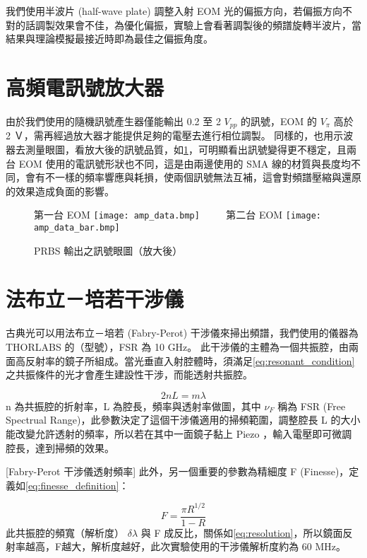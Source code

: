 \documentclass[class=NCU_thesis, crop=false]{standalone}
\begin{document}
我們使用半波片 (half-wave plate) 調整入射 EOM 光的偏振方向，若偏振方向不對的話調製效果會不佳，為優化偏振，實驗上會看著調製後的頻譜旋轉半波片，當結果與理論模擬最接近時即為最佳之偏振角度。

\section{高頻電訊號放大器}
由於我們使用的隨機訊號產生器僅能輸出 0.2 至 2 $V_{pp}$ 的訊號，EOM 的 $V_{\pi}$ 高於 2 Ｖ，需再經過放大器才能提供足夠的電壓去進行相位調製。
同樣的，也用示波器去測量眼圖，看放大後的訊號品質，如\cref{fig:amp_prbs_eye}，可明顯看出訊號變得更不穩定，且兩台 EOM 使用的電訊號形狀也不同，這是由兩邊使用的 SMA 線的材質與長度均不同，會有不一樣的頻率響應與耗損，使兩個訊號無法互補，這會對頻譜壓縮與還原的效果造成負面的影響。

\begin{figure}[!hbt]
    \centering
    \subcaptionbox
        {第一台 EOM
        \label{fig:subfig_fig1}}
        {\texttt{[image: amp\_data.bmp]}}
    ~~~~
    \subcaptionbox
        {第二台 EOM
        \label{fig:subfig_fig2}}
        {\texttt{[image: amp\_data\_bar.bmp]}}
    \caption{PRBS 輸出之訊號眼圖（放大後）}
    \label{fig:amp_prbs_eye}
\end{figure}

\section{法布立－培若干涉儀}
古典光可以用法布立－培若 (Fabry-Perot) 干涉儀來掃出頻譜，我們使用的儀器為 THORLABS 的（型號），FSR 為 10 GHz。
此干涉儀的主體為一個共振腔，由兩面高反射率的鏡子所組成。當光垂直入射腔體時，須滿足\cref{eq:resonant_condition} 之共振條件的光才會產生建設性干涉，而能透射共振腔。

\begin{equation}
    2nL=m\lambda
    \label{eq:resonant_condition}
\end{equation}
n 為共振腔的折射率，L 為腔長，頻率與透射率做圖，其中 $\nu_{F}$ 稱為 FSR (Free Spectrual Range)，此參數決定了這個干涉儀適用的掃頻範圍，調整腔長 L 的大小能改變允許透射的頻率，所以若在其中一面鏡子黏上 Piezo ，輸入電壓即可微調腔長，達到掃頻的效果。

[Fabry-Perot 干涉儀透射頻率]
此外，另一個重要的參數為精細度 F (Finesse)，定義如\cref{eq:finesse_definition}：

\begin{equation}
    F=\frac{\pi R^{1/2}}{1-R}
    \label{eq:finesse_definition}
\end{equation}
此共振腔的頻寬（解析度） $\delta \lambda$ 與 F 成反比，關係如\cref{eq:resolution}，所以鏡面反射率越高，F越大，解析度越好，此次實驗使用的干涉儀解析度約為 60 MHz。
\end{document}
